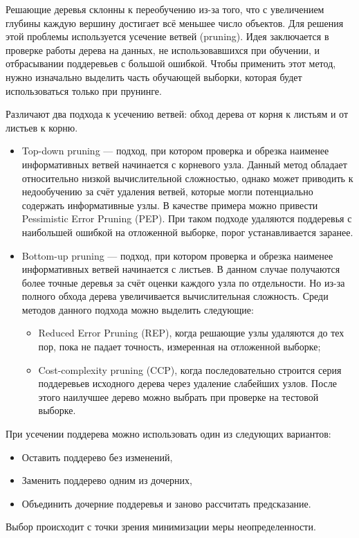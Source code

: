 Решающие деревья склонны к переобучению из-за того, что с увеличением глубины каждую вершину достигает всё меньшее число объектов. Для решения этой проблемы используется усечение ветвей (pruning). Идея заключается в проверке работы дерева на данных, не использовавшихся при обучении, и отбрасывании поддеревьев с большой ошибкой. Чтобы применить этот метод, нужно изначально выделить часть обучающей выборки, которая будет использоваться только при прунинге.

Различают два подхода к усечению ветвей: обход дерева от корня к листьям и от листьев к корню.     

\begin{itemize}
    \item Top-down pruning — подход, при котором проверка и обрезка наименее информативных ветвей начинается с корневого узла. Данный метод обладает относительно низкой вычислительной сложностью, однако может приводить к недообучению за счёт удаления ветвей, которые могли потенциально содержать информативные узлы. В качестве примера можно привести Pessimistic Error Pruning (PEP). При таком подходе удаляются поддеревья с наибольшей ошибкой на отложенной выборке, порог устанавливается заранее.
          
    \item Bottom-up pruning — подход, при котором проверка и обрезка наименее информативных ветвей начинается с листьев. В данном случае получаются более точные деревья за счёт оценки каждого узла по отдельности. Но из-за полного обхода дерева увеличивается вычислительная сложность. Среди методов данного подхода можно выделить следующие:
          \begin{itemize}
              \item Reduced Error Pruning (REP), когда решающие узлы удаляются до тех пор, пока не падает точность, измеренная на отложенной выборке;
                    
              \item Cost-complexity pruning (CCP), когда последовательно строится серия поддеревьев исходного дерева через удаление слабейших узлов. После этого наилучшее дерево можно выбрать при проверке на тестовой выборке.
          \end{itemize}
\end{itemize}

При усечении поддерева можно использовать один из следующих вариантов:
\begin{itemize}
    \item Оставить поддерево без изменений,
    \item Заменить поддерево одним из дочерних,
    \item Объединить дочерние поддеревья и заново рассчитать предсказание.
\end{itemize}
Выбор происходит с точки зрения минимизации меры неопределенности.

